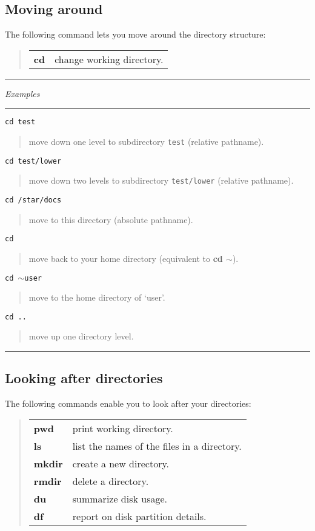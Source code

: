 \documentclass[twoside,11pt]{article}
\newcommand{\example}[2]{\goodbreak
                         {\tt #1}
                         \vspace*{-4mm}
                         \begin{quote}
                           {\small #2}
                         \end{quote}
                        }
\newcommand{\example}[2]{\goodbreak
                            {\tt #1}
                            \vspace*{-4mm}
                            \begin{quote}
                            {#2}
                            \end{quote}
                           }
\newcommand{\exbegin}{\begin{center}
                      \rule{18mm}{0.3mm}
                      {\em Examples}
                      \rule{18mm}{0.3mm}
                      \end{center}
                     }
\newcommand{\exend}{\begin{center}
                    \rule{50mm}{0.3mm}
                    \end{center}
                   }
\begin{document}
\subsection{Moving around}

The following command lets you move around the directory structure:

\begin{quote}
\begin{tabular}{lp{67mm}}

{\bf cd}  & change working directory.

\end{tabular}
\end{quote}

\goodbreak

\exbegin

\example{cd test}
{move down one level to subdirectory {\tt test} (relative pathname).}

\example{cd test/lower}
{move down two levels to subdirectory {\tt test/lower} (relative pathname).}

\example{cd /star/docs}
{move to this directory (absolute pathname).}

\example{cd}
{move back to your home directory (equivalent to {\bf cd $\sim$}).}

\example{cd $\sim$user}
{move to the home directory of `user'.}

\example{cd ..}
{move up one directory level.}

\exend

\subsection{Looking after directories}

The following commands enable you to look after your directories:

\begin{quote}
\begin{tabular}{lp{67mm}}

{\bf pwd}   & print working directory.\\
{\bf ls}    & list the names of the files in a directory.\\
{\bf mkdir} & create a new directory.\\
{\bf rmdir} & delete a directory.\\
{\bf du}    & summarize disk usage.\\
{\bf df}    & report on disk partition details.

\end{tabular}
\end{quote}
\end{document}
